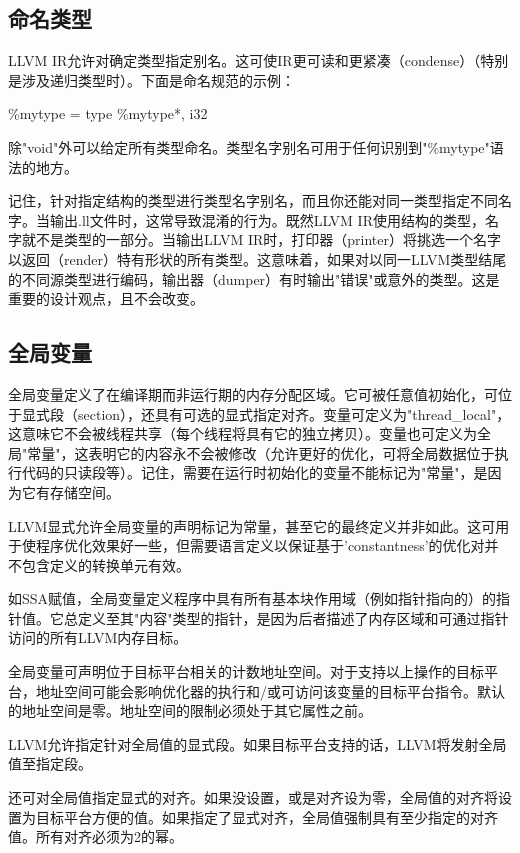 \documentclass[12pt,a4paper]{article}
\begin{document}
\subsection{命名类型}

LLVM IR允许对确定类型指定别名。这可使IR更可读和更紧凑（condense）（特别是涉及递归类型时）。下面是命名规范的示例：

\%mytype = type { \%mytype*, i32 }

除"void"外可以给定所有类型命名。类型名字别名可用于任何识别到"\%mytype"语法的地方。

记住，针对指定结构的类型进行类型名字别名，而且你还能对同一类型指定不同名字。当输出.ll文件时，这常导致混淆的行为。既然LLVM IR使用结构的类型，名字就不是类型的一部分。当输出LLVM IR时，打印器（printer）将挑选一个名字以返回（render）特有形状的所有类型。这意味着，如果对以同一LLVM类型结尾的不同源类型进行编码，输出器（dumper）有时输出"错误"或意外的类型。这是重要的设计观点，且不会改变。

\subsection{全局变量}

全局变量定义了在编译期而非运行期的内存分配区域。它可被任意值初始化，可位于显式段（section），还具有可选的显式指定对齐。变量可定义为"thread\_local"，这意味它不会被线程共享（每个线程将具有它的独立拷贝）。变量也可定义为全局"常量"，这表明它的内容永不会被修改（允许更好的优化，可将全局数据位于执行代码的只读段等）。记住，需要在运行时初始化的变量不能标记为"常量"，是因为它有存储空间。

LLVM显式允许全局变量的声明标记为常量，甚至它的最终定义并非如此。这可用于使程序优化效果好一些，但需要语言定义以保证基于'constantness'的优化对并不包含定义的转换单元有效。

如SSA赋值，全局变量定义程序中具有所有基本块作用域（例如指针指向的）的指针值。它总定义至其"内容"类型的指针，是因为后者描述了内存区域和可通过指针访问的所有LLVM内存目标。

全局变量可声明位于目标平台相关的计数地址空间。对于支持以上操作的目标平台，地址空间可能会影响优化器的执行和/或可访问该变量的目标平台指令。默认的地址空间是零。地址空间的限制必须处于其它属性之前。

LLVM允许指定针对全局值的显式段。如果目标平台支持的话，LLVM将发射全局值至指定段。

还可对全局值指定显式的对齐。如果没设置，或是对齐设为零，全局值的对齐将设置为目标平台方便的值。如果指定了显式对齐，全局值强制具有至少指定的对齐值。所有对齐必须为2的幂。
\end{document}
